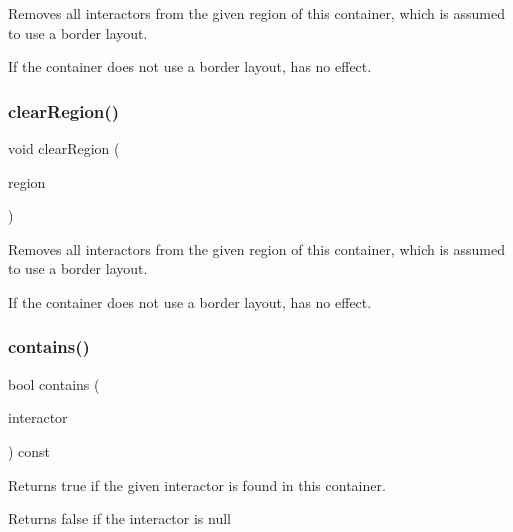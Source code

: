 Removes all interactors from the given region of this container, which is assumed to use a border layout. 

If the container does not use a border layout, has no effect. \mbox{\label{classGContainer_aeba526cb4d6d6f3d8d6f376656af8dc8}} 
\subsubsection{\texorpdfstring{clear\+Region()}{clearRegion()}\hspace{0.1cm}{\footnotesize\ttfamily [2/2]}}
{\footnotesize\ttfamily void clear\+Region (\begin{DoxyParamCaption}\item[{const std\+::string \&}]{region }\end{DoxyParamCaption})\hspace{0.3cm}{\ttfamily [virtual]}}



Removes all interactors from the given region of this container, which is assumed to use a border layout. 

If the container does not use a border layout, has no effect. \mbox{\label{classGContainer_a29e67f98cd36414c67475b8941d861a6}} 
\subsubsection{\texorpdfstring{contains()}{contains()}\hspace{0.1cm}{\footnotesize\ttfamily [1/2]}}
{\footnotesize\ttfamily bool contains (\begin{DoxyParamCaption}\item[{\mbox{\hyperlink{classGInteractor}{G\+Interactor}} $\ast$}]{interactor }\end{DoxyParamCaption}) const\hspace{0.3cm}{\ttfamily [virtual]}}



Returns true if the given interactor is found in this container. 

Returns false if the interactor is null \mbox{\label{classGContainer_a62fe1c67f06f657fea8b9b28672516a0}} 

